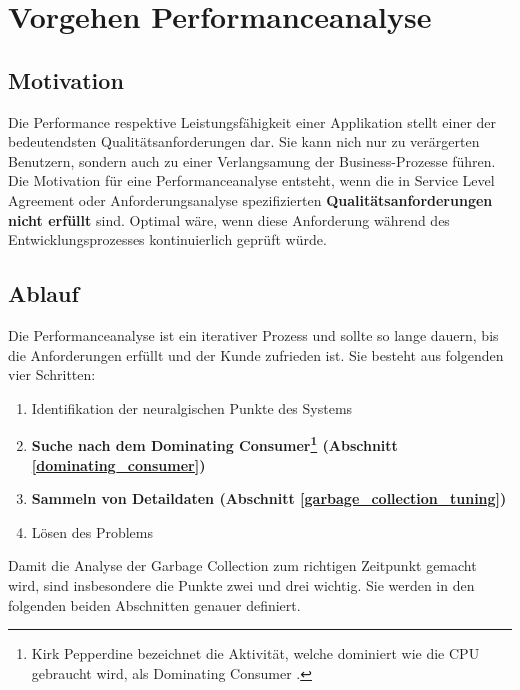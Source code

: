 \chapter{Vorgehen Performanceanalyse}
\section{Motivation}

Die Performance respektive Leistungsfähigkeit einer Applikation stellt einer der bedeutendsten Qualitätsanforderungen dar. Sie kann nich nur zu verärgerten Benutzern, sondern auch zu einer Verlangsamung der Business-Prozesse führen. Die Motivation für eine Performanceanalyse entsteht, wenn die in Service Level Agreement oder Anforderungsanalyse spezifizierten \textbf{Qualitätsanforderungen nicht erfüllt} sind. Optimal wäre, wenn diese Anforderung während des Entwicklungsprozesses kontinuierlich geprüft würde.

\section{Ablauf}
Die Performanceanalyse ist ein iterativer Prozess und sollte so lange dauern, bis die Anforderungen erfüllt und der Kunde zufrieden ist. Sie besteht aus folgenden vier Schritten\cite{hummelBeer201109}:
\begin{enumerate}
	\item Identifikation der neuralgischen Punkte des Systems
	\item \textbf{Suche nach dem Dominating Consumer\footnote{Kirk Pepperdine bezeichnet die Aktivität, welche dominiert wie die CPU gebraucht wird, als Dominating Consumer . } (Abschnitt \ref{dominating_consumer})}
	\item \textbf{Sammeln von Detaildaten (Abschnitt \ref{garbage_collection_tuning})}
	\item Lösen des Problems
\end{enumerate}


Damit die Analyse der Garbage Collection zum richtigen Zeitpunkt gemacht wird, sind insbesondere die Punkte zwei und drei wichtig. Sie werden in den folgenden beiden Abschnitten genauer definiert.
